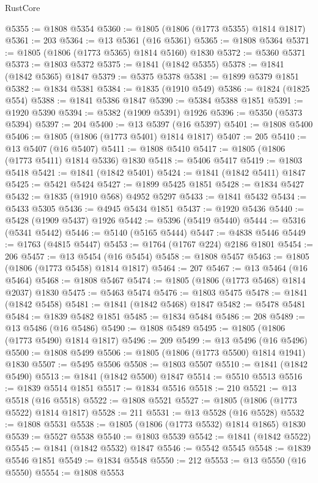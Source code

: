 \begin{lexlean}{RustCore}
\begin{coremodule}
@5355 := @1808 @5354
@5360 := @1805 (@1806 (@1773 @5355) @1814 @1817)
@5361 := 203
@5364 := @13 @5361 (@16 @5361)
@5365 := @1808 @5364
@5371 := @1805 (@1806 (@1773 @5365) @1814 @5160) @1830
@5372 := @5360 @5371
@5373 := @1803 @5372
@5375 := @1841 (@1842 @5355)
@5378 := @1841 (@1842 @5365) @1847
@5379 := @5375 @5378
@5381 := @1899 @5379 @1851
@5382 := @1834 @5381
@5384 := @1835 (@1910 @549)
@5386 := @1824 (@1825 @554)
@5388 := @1841 @5386 @1847
@5390 := @5384 @5388 @1851
@5391 := @1920 @5390
@5394 := @5382 (@1909 @5391) @1926
@5396 := @5350 (@5373 @5394)
@5397 := 204
@5400 := @13 @5397 (@16 @5397)
@5401 := @1808 @5400
@5406 := @1805 (@1806 (@1773 @5401) @1814 @1817)
@5407 := 205
@5410 := @13 @5407 (@16 @5407)
@5411 := @1808 @5410
@5417 := @1805 (@1806 (@1773 @5411) @1814 @5336) @1830
@5418 := @5406 @5417
@5419 := @1803 @5418
@5421 := @1841 (@1842 @5401)
@5424 := @1841 (@1842 @5411) @1847
@5425 := @5421 @5424
@5427 := @1899 @5425 @1851
@5428 := @1834 @5427
@5432 := @1835 (@1910 @568) @4952 @5297
@5433 := @1841 @5432
@5434 := @5433 @5305
@5436 := @4945 @5434 @1851
@5437 := @1920 @5436
@5440 := @5428 (@1909 @5437) @1926
@5442 := @5396 (@5419 @5440)
@5444 := @5316 (@5341 @5442)
@5446 := @5140 (@5165 @5444)
@5447 := @4838 @5446
@5449 := @1763 (@4815 @5447)
@5453 := @1764 (@1767 @224) @2186 @1801
@5454 := 206
@5457 := @13 @5454 (@16 @5454)
@5458 := @1808 @5457
@5463 := @1805 (@1806 (@1773 @5458) @1814 @1817)
@5464 := 207
@5467 := @13 @5464 (@16 @5464)
@5468 := @1808 @5467
@5474 := @1805 (@1806 (@1773 @5468) @1814 @2037) @1830
@5475 := @5463 @5474
@5476 := @1803 @5475
@5478 := @1841 (@1842 @5458)
@5481 := @1841 (@1842 @5468) @1847
@5482 := @5478 @5481
@5484 := @1839 @5482 @1851
@5485 := @1834 @5484
@5486 := 208
@5489 := @13 @5486 (@16 @5486)
@5490 := @1808 @5489
@5495 := @1805 (@1806 (@1773 @5490) @1814 @1817)
@5496 := 209
@5499 := @13 @5496 (@16 @5496)
@5500 := @1808 @5499
@5506 := @1805 (@1806 (@1773 @5500) @1814 @1941) @1830
@5507 := @5495 @5506
@5508 := @1803 @5507
@5510 := @1841 (@1842 @5490)
@5513 := @1841 (@1842 @5500) @1847
@5514 := @5510 @5513
@5516 := @1839 @5514 @1851
@5517 := @1834 @5516
@5518 := 210
@5521 := @13 @5518 (@16 @5518)
@5522 := @1808 @5521
@5527 := @1805 (@1806 (@1773 @5522) @1814 @1817)
@5528 := 211
@5531 := @13 @5528 (@16 @5528)
@5532 := @1808 @5531
@5538 := @1805 (@1806 (@1773 @5532) @1814 @1865) @1830
@5539 := @5527 @5538
@5540 := @1803 @5539
@5542 := @1841 (@1842 @5522)
@5545 := @1841 (@1842 @5532) @1847
@5546 := @5542 @5545
@5548 := @1839 @5546 @1851
@5549 := @1834 @5548
@5550 := 212
@5553 := @13 @5550 (@16 @5550)
@5554 := @1808 @5553

\end{coremodule}
\end{lexlean}
